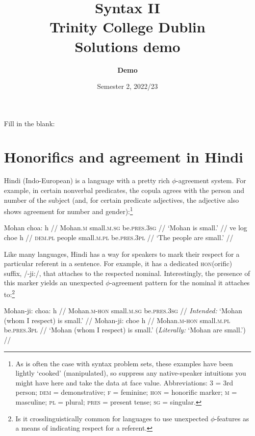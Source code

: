 \documentclass[11pt,a4paper]{article}
\title{\textbf{Syntax II}\vspace{-5pt}\\
{\normalsize Trinity College Dublin}\vspace{5pt}\\
{\Large Solutions demo \inSolution{--- Notes for students}}\vspace{-5pt}}
\author{\textbf{Demo}}
\date{Semester 2, 2022/23\vspace{-12pt}}
\newcounter{ques}\stepcounter{ques}	%
\begin{document}
\maketitle
{}	%

\ex Fill in the blank: 
\xe


\section{Honorifics and agreement in Hindi}  %

\noindent Hindi (Indo-European) is a language with a pretty rich $\phi$-agreement system. For example, in certain nonverbal predicates, the copula agrees with the person and number of the subject (and, for certain predicate adjectives, the adjective also shows agreement for number and gender):\footnote{As is often the case with syntax problem sets, these examples have been lightly `cooked' (manipulated), so suppress any native-speaker intuitions you might have here and take the data at face value. Abbreviations: \textsc{3} = 3rd person; \textsc{dem} = demonstrative; \textsc{f} = feminine; \textsc{hon} = honorific marker; \textsc{m} = masculine; \textsc{pl} = plural; \textsc{pres} = present tense; \textsc{sg} = singular.}

\pex
\a
	\begingl
	\gla	Mohan choa: h	//
	\glb	Mohan.\textsc{m} small.\textsc{m.sg} be.\textsc{pres.3sg}	//
	\glft	`Mohan is small.'	//
	\endgl	
\a
	\begingl
	\gla	ve  log choe h	//
	\glb	\textsc{dem}.\textsc{pl} people small.\textsc{m.pl} be.\textsc{pres.3pl}	//
	\glft	`The people are small.'	//
	\endgl	
\xe

\noindent Like many languages, Hindi has a way for speakers to mark their respect for a particular referent in a sentence. For example, it has a dedicated \textsc{hon}(orific) suffix, /-ji:/, that attaches to the respected nominal. Interestingly, the presence of this marker yields an unexpected $\phi$-agreement pattern for the nominal it attaches to:\footnote{Is it crosslinguistically common for languages to use unexpected $\phi$-features as a means of indicating respect for a referent.}


\pex\label{hindi-mohan}
\a \ljudge{*}
	\begingl
	\gla	Mohan-ji: choa: h	//
	\glb	Mohan.\textsc{m-hon} small.\textsc{m.sg} be.\textsc{pres.3sg}	//
	\glft	\textit{Intended:} `Mohan (whom I respect) is small.'	//
	\endgl	
\a
	\begingl
	\gla	Mohan-ji: choe h	//
	\glb	Mohan.\textsc{m-hon} small.\textsc{m.pl} be.\textsc{pres.3pl}	//
	\glft	`Mohan (whom I respect) is small.' (\textit{Literally:} `Mohan are small.')	//
	\endgl	
\xe
\end{document}
